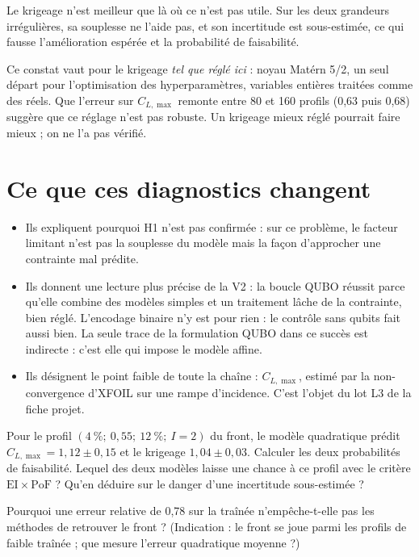 \begin{resultat}
Le krigeage n'est meilleur que là où ce n'est pas utile. Sur les deux grandeurs irrégulières, sa souplesse ne l'aide pas, et son incertitude est sous-estimée, ce qui fausse l'amélioration espérée et la probabilité de faisabilité.
\end{resultat}

\begin{piege}
Ce constat vaut pour le krigeage \emph{tel que réglé ici} : noyau Matérn 5/2, un seul départ pour l'optimisation des hyperparamètres, variables entières traitées comme des réels. Que l'erreur sur $C_{L,\max}$ remonte entre 80 et 160 profils (0,63 puis 0,68) suggère que ce réglage n'est pas robuste. Un krigeage mieux réglé pourrait faire mieux ; on ne l'a pas vérifié.
\end{piege}

\section{Ce que ces diagnostics changent}
\begin{itemize}
\item Ils expliquent pourquoi H1 n'est pas confirmée : sur ce problème, le facteur limitant n'est pas la souplesse du modèle mais la façon d'approcher une contrainte mal prédite.
\item Ils donnent une lecture plus précise de la V2 : la boucle QUBO réussit parce qu'elle combine des modèles simples et un traitement lâche de la contrainte, bien réglé. L'encodage binaire n'y est pour rien : le contrôle sans qubits fait aussi bien. La seule trace de la formulation QUBO dans ce succès est indirecte : c'est elle qui impose le modèle affine.
\item Ils désignent le point faible de toute la chaîne : $C_{L,\max}$, estimé par la non-convergence d'XFOIL sur une rampe d'incidence. C'est l'objet du lot L3 de la fiche projet.
\end{itemize}

\exercices
\begin{exercice}
Pour le profil $(4~\%;\ 0{,}55;\ 12~\%;\ I=2)$ du front, le modèle quadratique prédit $C_{L,\max}=1{,}12\pm0{,}15$ et le krigeage $1{,}04\pm0{,}03$. Calculer les deux probabilités de faisabilité. Lequel des deux modèles laisse une chance à ce profil avec le critère $\mathrm{EI}\times\mathrm{PoF}$ ? Qu'en déduire sur le danger d'une incertitude sous-estimée ?
\end{exercice}
\begin{exercice}
Pourquoi une erreur relative de 0,78 sur la traînée n'empêche-t-elle pas les méthodes de retrouver le front ? (Indication : le front se joue parmi les profils de faible traînée ; que mesure l'erreur quadratique moyenne ?)
\end{exercice}

